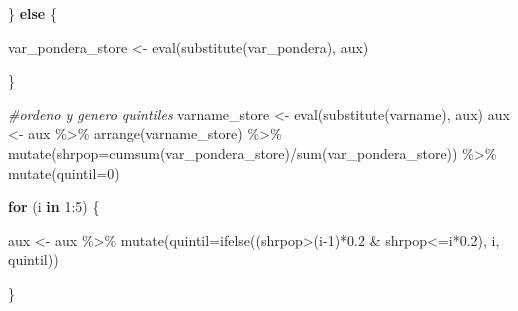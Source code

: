 \documentclass[
]{book}
\newenvironment{Shaded}{\begin{snugshade}}{\end{snugshade}}
\newcommand{\AttributeTok}[1]{\textcolor[rgb]{0.77,0.63,0.00}{#1}}
\newcommand{\CommentTok}[1]{\textcolor[rgb]{0.56,0.35,0.01}{\textit{#1}}}
\newcommand{\ControlFlowTok}[1]{\textcolor[rgb]{0.13,0.29,0.53}{\textbf{#1}}}
\newcommand{\DecValTok}[1]{\textcolor[rgb]{0.00,0.00,0.81}{#1}}
\newcommand{\FloatTok}[1]{\textcolor[rgb]{0.00,0.00,0.81}{#1}}
\newcommand{\FunctionTok}[1]{\textcolor[rgb]{0.00,0.00,0.00}{#1}}
\newcommand{\NormalTok}[1]{#1}
\newcommand{\OtherTok}[1]{\textcolor[rgb]{0.56,0.35,0.01}{#1}}
\newcommand{\SpecialCharTok}[1]{\textcolor[rgb]{0.00,0.00,0.00}{#1}}
\begin{document}
\begin{Shaded}
\begin{Highlighting}[numbers=left,,]
\NormalTok{      \} }\ControlFlowTok{else}\NormalTok{ \{}
      
\NormalTok{      var\_pondera\_store }\OtherTok{\textless{}{-}} \FunctionTok{eval}\NormalTok{(}\FunctionTok{substitute}\NormalTok{(var\_pondera), aux)}
      
\NormalTok{    \}}
    
    
    \CommentTok{\#ordeno y genero quintiles}
\NormalTok{    varname\_store }\OtherTok{\textless{}{-}} \FunctionTok{eval}\NormalTok{(}\FunctionTok{substitute}\NormalTok{(varname), aux)}
\NormalTok{    aux }\OtherTok{\textless{}{-}}\NormalTok{ aux }\SpecialCharTok{\%\textgreater{}\%} \FunctionTok{arrange}\NormalTok{(varname\_store) }\SpecialCharTok{\%\textgreater{}\%}
                   \FunctionTok{mutate}\NormalTok{(}\AttributeTok{shrpop=}\FunctionTok{cumsum}\NormalTok{(var\_pondera\_store)}\SpecialCharTok{/}\FunctionTok{sum}\NormalTok{(var\_pondera\_store)) }\SpecialCharTok{\%\textgreater{}\%} 
                   \FunctionTok{mutate}\NormalTok{(}\AttributeTok{quintil=}\DecValTok{0}\NormalTok{)}
    
    \ControlFlowTok{for}\NormalTok{ (i }\ControlFlowTok{in} \DecValTok{1}\SpecialCharTok{:}\DecValTok{5}\NormalTok{) \{}
      
\NormalTok{     aux }\OtherTok{\textless{}{-}}\NormalTok{ aux }\SpecialCharTok{\%\textgreater{}\%} \FunctionTok{mutate}\NormalTok{(}\AttributeTok{quintil=}\FunctionTok{ifelse}\NormalTok{((shrpop}\SpecialCharTok{\textgreater{}}\NormalTok{(i}\DecValTok{{-}1}\NormalTok{)}\SpecialCharTok{*}\FloatTok{0.2} \SpecialCharTok{\&}\NormalTok{ shrpop}\SpecialCharTok{\textless{}=}\NormalTok{i}\SpecialCharTok{*}\FloatTok{0.2}\NormalTok{), i, quintil)) }
      
\NormalTok{    \}  }
    

\end{Highlighting}
\end{Shaded}
\end{document}
